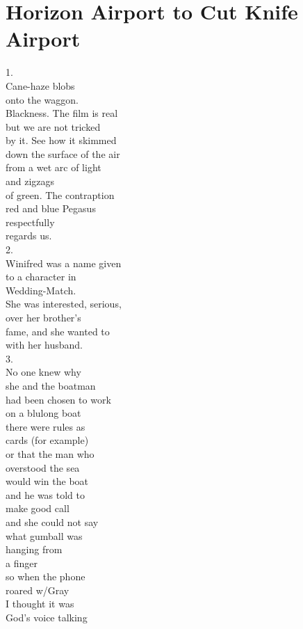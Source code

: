 \documentclass[smalldemyvopaper,11pt,twoside,onecolumn,openright,extrafontsizes]{memoir}
\begin{document}
\chapter{Horizon Airport to Cut Knife Airport}
1.
\\Cane-haze blobs
\\onto the waggon.
\\Blackness. The film is real
\\but we are not tricked
\\by it. See how it skimmed
\\down the surface of the air
\\from a wet arc of light
\\and zigzags
\\of green. The contraption
\\red and blue Pegasus
\\respectfully
\\regards us.
\\2.
\\Winifred was a name given
\\to a character in
\\Wedding-Match.
\\She was interested, serious,
\\over her brother's
\\fame, and she wanted to
\\with her husband.
\\3.
\\No one knew why
\\she and the boatman
\\had been chosen to work
\\on a blulong boat
\\there were rules as
\\cards (for example)
\\or that the man who
\\overstood the sea
\\would win the boat
\\and he was told to
\\make good call
\\and she could not say
\\what gumball was
\\hanging from
\\a finger
\\so when the phone
\\roared w/Gray
\\I thought it was
\\God's voice talking
\end{document}
